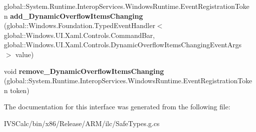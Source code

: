 \begin{DoxyCompactItemize}
global\+::\+System.\+Runtime.\+Interop\+Services.\+Windows\+Runtime.\+Event\+Registration\+Token {\bfseries add\+\_\+\+Dynamic\+Overflow\+Items\+Changing} (global\+::\+Windows.\+Foundation.\+Typed\+Event\+Handler$<$ global\+::\+Windows.\+U\+I.\+Xaml.\+Controls.\+Command\+Bar, global\+::\+Windows.\+U\+I.\+Xaml.\+Controls.\+Dynamic\+Overflow\+Items\+Changing\+Event\+Args $>$ value)
\item 
\mbox{\label{interface_windows_1_1_u_i_1_1_xaml_1_1_controls_1_1_i_command_bar3_a45e56795c020f83b9e93caf640a4736b}} 
void {\bfseries remove\+\_\+\+Dynamic\+Overflow\+Items\+Changing} (global\+::\+System.\+Runtime.\+Interop\+Services.\+Windows\+Runtime.\+Event\+Registration\+Token token)
\end{DoxyCompactItemize}


The documentation for this interface was generated from the following file\+:\begin{DoxyCompactItemize}
\item 
I\+V\+S\+Calc/bin/x86/\+Release/\+A\+R\+M/ilc/Safe\+Types.\+g.\+cs\end{DoxyCompactItemize}
